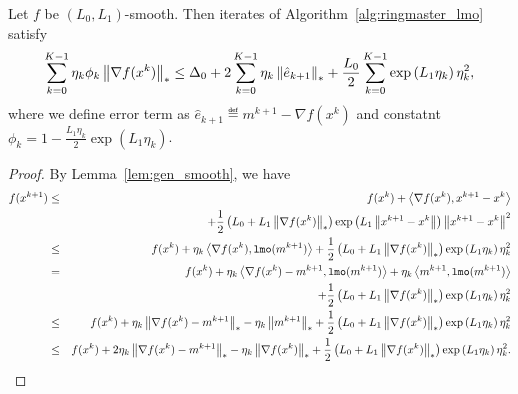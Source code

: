 \documentclass{article}
\begin{document}
\begin{lemma}
    \label{lem:descent_lemma}
    Let $f$ be $(L_0, L_1)$-smooth. Then iterates of Algorithm~\ref{alg:ringmaster_lmo} satisfy 
    \begin{equation}
        \sum_{k=0}^{K-1}\eta_k\phi_k\left\| \nabla f(x^k) \right\|_* \leq \Delta_0 + 2\sum^{K-1}_{k=0}\eta_k\left\| \hat{e}_{k+1} \right\|_* +\frac{L_0}{2}\sum^{K-1}_{k=0}\exp\left(L_1\eta_k\right)\eta_k^2,
    \end{equation}
    where we define error term as $\hat{e}_{k+1} \eqdef m^{k+1} - \nabla f(x^k)$ and constatnt $\phi_k  = 1-\frac{L_1\eta_k}{2}\exp(L_1\eta_k)$. 
\end{lemma}
\begin{proof}
    By Lemma~\ref{lem:gen_smooth}, we have 
    \begin{eqnarray*}
        f(x^{k+1}) &\le& f(x^k) + \left\langle\nabla f(x^k),x^{k+1}-x^k\right\rangle\\
        && +\frac{1}{2}\left(L_0 + L_1\left\| \nabla f(x^k) \right\|_*\right)\exp\left(L_1\left\| x^{k+1}-x^k \right\|\right)\left\| x^{k+1}-x^k \right\|^2\\
        &\le& f(x^k) + \eta_k\left\langle\nabla f(x^k),\texttt{lmo}(m^{k+1})\right\rangle +\frac{1}{2}\left(L_0 + L_1\left\| \nabla f(x^k) \right\|_*\right)\exp\left(L_1\eta_k\right)\eta_k^2\\
        &=& f(x^k) + \eta_k\left\langle\nabla f(x^k) - m^{k+1},\texttt{lmo}(m^{k+1})\right\rangle + \eta_k\left\langle m^{k+1},\texttt{lmo}(m^{k+1})\right\rangle \\
        && +\frac{1}{2}\left(L_0 + L_1\left\| \nabla f(x^k) \right\|_*\right)\exp\left(L_1\eta_k\right)\eta_k^2\\
        &\le& f(x^k) + \eta_k\left\| \nabla f(x^k) - m^{k+1} \right\|_* - \eta_k\left\| m^{k+1} \right\|_*  +\frac{1}{2}\left(L_0 + L_1\left\| \nabla f(x^k) \right\|_*\right)\exp\left(L_1\eta_k\right)\eta_k^2\\
        &\le& f(x^k) + 2\eta_k\left\| \nabla f(x^k) - m^{k+1} \right\|_* - \eta_k\left\| \nabla f(x^k) \right\|_*  +\frac{1}{2}\left(L_0 + L_1\left\| \nabla f(x^k) \right\|_*\right)\exp\left(L_1\eta_k\right)\eta_k^2.
    \end{eqnarray*}
\end{proof}
\end{document}
